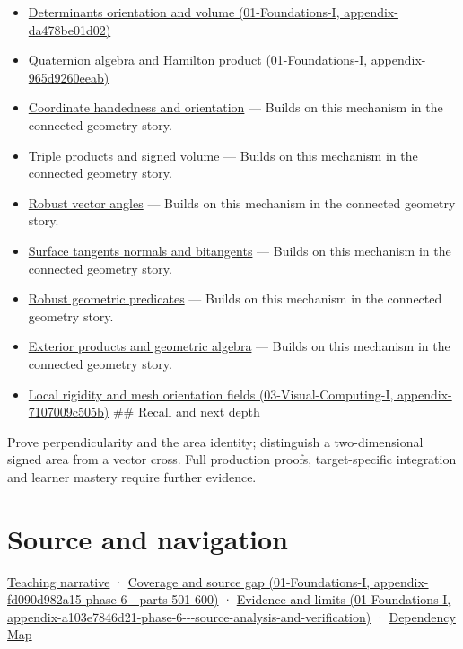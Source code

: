 \begin{itemize}
\item
  \href{../01-Foundations-I/main.pdf\#nameddest=appendix-da478be01d02}{Determinants orientation and volume (01-Foundations-I, appendix-da478be01d02)}
\item
  \href{../01-Foundations-I/main.pdf\#nameddest=appendix-965d9260eeab}{Quaternion algebra and Hamilton product (01-Foundations-I, appendix-965d9260eeab)}
\item
  \hyperref[appendix-87d7626c8d37]{Coordinate handedness and orientation} --- Builds on this mechanism in the connected geometry story.
\item
  \hyperref[appendix-5caa058bd9c7]{Triple products and signed volume} --- Builds on this mechanism in the connected geometry story.
\item
  \hyperref[appendix-e569e60e18e6]{Robust vector angles} --- Builds on this mechanism in the connected geometry story.
\item
  \hyperref[appendix-e31893dec985]{Surface tangents normals and bitangents} --- Builds on this mechanism in the connected geometry story.
\item
  \hyperref[appendix-341296fb3f64]{Robust geometric predicates} --- Builds on this mechanism in the connected geometry story.
\item
  \hyperref[appendix-e1960925d1b8]{Exterior products and geometric algebra} --- Builds on this mechanism in the connected geometry story.
\item
  \href{../03-Visual-Computing-I/main.pdf\#nameddest=appendix-7107009c505b}{Local rigidity and mesh orientation fields (03-Visual-Computing-I, appendix-7107009c505b)} \#\# Recall and next depth
\end{itemize}

Prove perpendicularity and the area identity; distinguish a two-dimensional signed area from a vector cross. Full production proofs, target-specific integration and learner mastery require further evidence.

\section{Source and navigation}\label{appendix-2391db8052b1-source-and-navigation}

\href{Continuous\%20Notes/Computing\%20Foundations\%20-\%20From\%20Bits\%20to\%20C++\%20and\%20Systems\%20APIs\#Oriented\%20area\%20tells\%20us\%20which\%20side\%20of\%20the\%20panel\%20is\%20front}{Teaching narrative} · \href{../01-Foundations-I/main.pdf\#nameddest=appendix-fd090d982a15-phase-6---parts-501-600}{Coverage and source gap (01-Foundations-I, appendix-fd090d982a15-phase-6-\/-\/-parts-501-600)} · \href{../01-Foundations-I/main.pdf\#nameddest=appendix-a103e7846d21-phase-6---source-analysis-and-verification}{Evidence and limits (01-Foundations-I, appendix-a103e7846d21-phase-6-\/-\/-source-analysis-and-verification)} · \hyperref[appendix-4ad47bdd269a]{Dependency Map}
